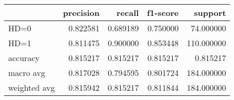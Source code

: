 \begin{tabular}{lrrrr}
\toprule
{} &  precision &    recall &  f1-score &     support \\
\midrule
HD=0         &   0.822581 &  0.689189 &  0.750000 &   74.000000 \\
HD=1         &   0.811475 &  0.900000 &  0.853448 &  110.000000 \\
accuracy     &   0.815217 &  0.815217 &  0.815217 &    0.815217 \\
macro avg    &   0.817028 &  0.794595 &  0.801724 &  184.000000 \\
weighted avg &   0.815942 &  0.815217 &  0.811844 &  184.000000 \\
\bottomrule
\end{tabular}
